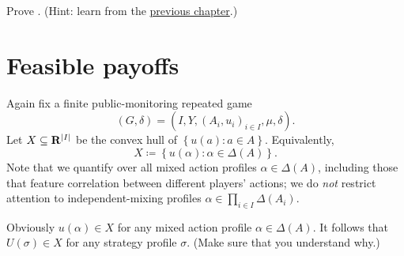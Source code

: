 \begin{exercise}
	\label{exercise:osdp_ppe}
	Prove . (Hint: learn from the \hyperref[ch_osdp]{previous chapter}.)
\end{exercise}



\section{Feasible payoffs}
\label{aps:feasible}

Again fix a finite public-monitoring repeated game
%
\begin{equation*}
	(G,\delta) = \left( I, Y, (A_i, u_i)_{i \in I}, \mu, \delta \right) .
\end{equation*}
%
Let $X \subseteq \R^{\abs*{I}}$ be the convex hull of $\left\{ u(a) : a \in A \right\}$. Equivalently,
%
\begin{equation*}
	X \coloneqq \left\{
	u(\alpha) : \alpha \in \Delta(A)
	\right\} .
\end{equation*}
%
Note that we quantify over all mixed action profiles $\alpha \in \Delta(A)$, including those that feature correlation between different players' actions; we do \emph{not} restrict attention to independent-mixing profiles $\alpha \in \prod_{i \in I} \Delta(A_i)$.

Obviously $u(\alpha) \in X$ for any mixed action profile $\alpha \in \Delta(A)$. It follows that $U(\sigma) \in X$ for any strategy profile $\sigma$. (Make sure that you understand why.) 

